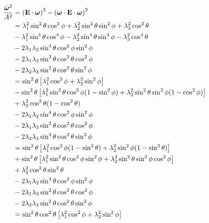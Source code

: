 \documentclass[extra,mreferee]{gji}
\begin{document}
\begin{equation}
\begin{aligned}
\frac{\dot{\mitbf{\omega}}^2}{A^2}  &= 
 \left(\mathbf{E}\cdot \mitbf{\omega}\right)^2
 - \left(\mitbf{\omega} \cdot \mathbf{E} \cdot \mitbf{\omega} \right)^2  \\
&=
\lambda_1^2 \sin^2{\theta} \cos^2{\phi} + \lambda_2^2 \sin^2{\theta} \sin^2{\phi} + \lambda_3^2 \cos^2{\theta} \\
&-\lambda_1^2 \sin^4{\theta} \cos^4{\phi} - 
\lambda_2^2 \sin^4{\theta} \sin^4{\phi} -
\lambda_3^2 \cos^4{\theta} \\
&- 2 \lambda_1 \lambda_2 \sin^4{\theta} \cos^2{\phi}\sin^2{\phi} \\ 
&- 2 \lambda_1 \lambda_3 \sin^2{\theta} \cos^2{\theta} \cos^2{\phi} \\
&- 2 \lambda_2 \lambda_3 \sin^2{\theta} \cos^2{\theta} \sin^2{\phi} \\ 
&=
\sin^2{\theta} \left[\lambda_1^2 \cos^2{\phi} + \lambda_2^2 \sin^2{\phi} \right] \\
&- \sin^2{\theta} \left[ \lambda_1^2 \sin^2{\theta} \cos^2{\phi}(1-\sin^2{\phi}) + \lambda_2^2 \sin^2{\theta} \sin^2{\phi}(1-\cos^2{\phi}) \right] \\
&+ \lambda_3^2 \cos^2{\theta}(1-\cos^2{\theta}) \\
&- 2 \lambda_1 \lambda_2 \sin^4{\theta} \cos^2{\phi}\sin^2{\phi} \\ 
&- 2 \lambda_1 \lambda_3 \sin^2{\theta} \cos^2{\theta} \cos^2{\phi} \\
&- 2 \lambda_2 \lambda_3 \sin^2{\theta} \cos^2{\theta} \sin^2{\phi} \\ 
&=
\sin^2{\theta} \left[\lambda_1^2 \cos^2{\phi} (1 - \sin^2{\theta}) + \lambda_2^2 \sin^2{\phi} (1-\sin^2{\theta}) \right] \\
&+ \sin^2{\theta} \left[ \lambda_1^2 \sin^2{\theta} \cos^2{\phi}\sin^2{\phi} + \lambda_2^2 \sin^2{\theta} \sin^2{\phi}\cos^2{\phi} \right] \\
&+ \lambda_3^2 \cos^2{\theta}\sin^2{\theta} \\
&- 2 \lambda_1 \lambda_2 \sin^4{\theta} \cos^2{\phi}\sin^2{\phi} \\ 
&- 2 \lambda_1 \lambda_3 \sin^2{\theta} \cos^2{\theta} \cos^2{\phi} \\
&- 2 \lambda_2 \lambda_3 \sin^2{\theta} \cos^2{\theta} \sin^2{\phi} \\ 
&=
\sin^2{\theta}\cos^2{\theta} \left[\lambda_1^2 \cos^2{\phi} + \lambda_2^2 \sin^2{\phi} \right] \\

\end{aligned}
\end{equation}
\end{document}
